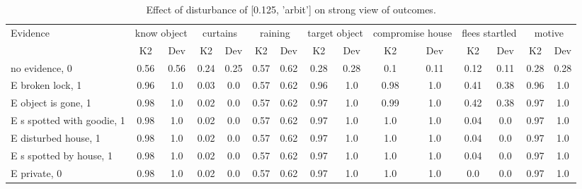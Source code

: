 \begin{table}\begin{tabular}{l|cc|cc|cc|cc|cc|cc|cc}\toprule\multirow{2}{*}{Evidence} & \multicolumn{2}{c}{know object}& \multicolumn{2}{c}{curtains}& \multicolumn{2}{c}{raining}& \multicolumn{2}{c}{target object}& \multicolumn{2}{c}{compromise house}& \multicolumn{2}{c}{flees startled}& \multicolumn{2}{c}{motive}\\& {K2} & {Dev}& {K2} & {Dev}& {K2} & {Dev}& {K2} & {Dev}& {K2} & {Dev}& {K2} & {Dev}& {K2} & {Dev}\\\midrule
no evidence, 0 & 0.56&0.56&0.24&0.25&\cellcolor{Bittersweet}0.57&\cellcolor{Bittersweet}0.62&0.28&0.28&0.1&0.11&0.12&0.11&0.28&0.28\\E broken lock, 1 & 0.96&1.0&0.03&0.0&\cellcolor{Bittersweet}0.57&\cellcolor{Bittersweet}0.62&0.96&1.0&0.98&1.0&0.41&0.38&0.96&1.0\\E object is gone, 1 & 0.98&1.0&0.02&0.0&\cellcolor{Bittersweet}0.57&\cellcolor{Bittersweet}0.62&0.97&1.0&0.99&1.0&0.42&0.38&0.97&1.0\\E s spotted with goodie, 1 & 0.98&1.0&0.02&0.0&\cellcolor{Bittersweet}0.57&\cellcolor{Bittersweet}0.62&0.97&1.0&1.0&1.0&0.04&0.0&0.97&1.0\\E disturbed house, 1 & 0.98&1.0&0.02&0.0&\cellcolor{Bittersweet}0.57&\cellcolor{Bittersweet}0.62&0.97&1.0&1.0&1.0&0.04&0.0&0.97&1.0\\E s spotted by house, 1 & 0.98&1.0&0.02&0.0&\cellcolor{Bittersweet}0.57&\cellcolor{Bittersweet}0.62&0.97&1.0&1.0&1.0&0.04&0.0&0.97&1.0\\E private, 0 & 0.98&1.0&0.02&0.0&\cellcolor{Bittersweet}0.57&\cellcolor{Bittersweet}0.62&0.97&1.0&1.0&1.0&0.0&0.0&0.97&1.0\\\bottomrule\end{tabular}\caption{Effect of disturbance of [0.125, 'arbit'] on strong view of outcomes.}\end{table}